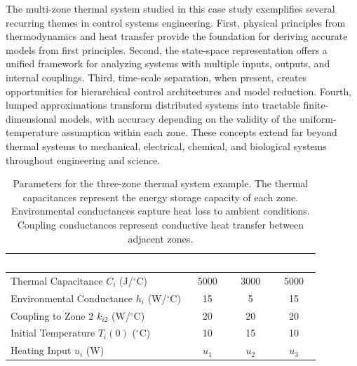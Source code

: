 The multi-zone thermal system studied in this case study exemplifies several recurring themes in control systems engineering. First, physical principles from thermodynamics and heat transfer provide the foundation for deriving accurate models from first principles. Second, the state-space representation offers a unified framework for analyzing systems with multiple inputs, outputs, and internal couplings. Third, time-scale separation, when present, creates opportunities for hierarchical control architectures and model reduction. Fourth, lumped approximations transform distributed systems into tractable finite-dimensional models, with accuracy depending on the validity of the uniform-temperature assumption within each zone. These concepts extend far beyond thermal systems to mechanical, electrical, chemical, and biological systems throughout engineering and science.

\begin{table}[htbp]
\centering
\begin{tabular}{|l|c|c|c|}
\hline
\rowcolor{UofSCGarnet}
\textcolor{white}{\textbf{Parameter}} & \textcolor{white}{\textbf{Zone 1}} & \textcolor{white}{\textbf{Zone 2}} & \textcolor{white}{\textbf{Zone 3}} \\
\hline
Thermal Capacitance $C_i$ (J/$\!^\circ$C) & 5000 & 3000 & 5000 \\
\hline
Environmental Conductance $h_i$ (W/$\!^\circ$C) & 15 & 5 & 15 \\
\hline
Coupling to Zone 2 $k_{i2}$ (W/$\!^\circ$C) & 20 & 20 & 20 \\
\hline
Initial Temperature $T_i(0)$ ($\!^\circ$C) & 10 & 15 & 10 \\
\hline
Heating Input $u_i$ (W) & $u_1$ & $u_2$ & $u_3$ \\
\hline
\end{tabular}
\captionsetup{type=table}
\caption{Parameters for the three-zone thermal system example. The thermal capacitances represent the energy storage capacity of each zone. Environmental conductances capture heat loss to ambient conditions. Coupling conductances represent conductive heat transfer between adjacent zones.}
\end{table}
